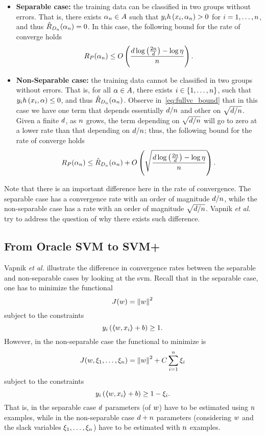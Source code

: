 \begin{itemize}
    \item \textbf{Separable case:} the training data can be classified in two groups without errors. That is, there exists $\alpha_n \in A$ such that $y_i h\left(x_i, \alpha_n\right) > 0$ for $i = 1, \ldots, n$, and thus $\hat{R}_{D_{n}}(\alpha_n) = 0$.
    In this case, the following bound for the rate of converge holds
    \begin{equation}
        \nonumber
        R_P(\alpha_n) \leq O\left( \frac{d \log\left(\frac{2n}{d} \right) - \log\eta}{n}  \right) .
    \end{equation}
    \item \textbf{Non-Separable case:} the training data cannot be classified in two groups without errors. That is, for all $\alpha \in A$, there exists $i \in \left\{1, \ldots, n\right\}$, such that $y_i h\left(x_i, \alpha\right) \leq 0$, and thus $\hat{R}_{D_{n}}(\alpha_n)$.
    Observe in~\eqref{eq:fullvc_bound} that in this case we have one term that depends essentially $d/n$ and other on $\sqrt{d/n}$. Given a finite $d$, as $n$ grows, the term depending on $\sqrt{d/n}$ will go to zero at a lower rate than that depending on $d/n$; thus, the following bound for the rate of converge holds
    \begin{equation}
        \label{eq:nonsep_bound}
        \exprisk(\param_\nsamples) \leq \empriskn(\param_\nsamples) + \bigO{\sqrt{\frac{\vc \log\left(\frac{2\nsamples}{\vc} \right) - \log\eta}{\nsamples}} } .
    \end{equation}
    
\end{itemize}
Note that there is an important difference here in the rate of convergence. The separable case has a convergence rate with an order of magnitude $d/n$, while the non-separable case has a rate with an order of magnitude $\sqrt{d/n}$. Vapnik \emph{et al.} try to address the question of why there exists such difference.

\subsection{From Oracle SVM to SVM+}
Vapnik \emph{et al.} illustrate the difference in convergence rates between the separable and non-separable cases by looking at the \acrshort{svm}. Recall that in the separable case, one has to minimize the functional 
$$J(w) = \left\lVert w\right\rVert^2$$
subject to the constraints
$$y_i \left( \bm{\left\langle} w, x_i \bm{\right\rangle} + b \right) \geq 1.$$
However, in the non-separable case the functional to minimize is 
$$J(w, \xi_1, \ldots, \xi_n) = \left\lVert w\right\rVert^2 + C \sum_{i=1}^n \xi_i$$
subject to the constraints
$$y_i \left( \bm{\left\langle} w, x_i \bm{\right\rangle} + b \right) \geq 1 - \xi_i.$$
That is, in the separable case $d$ parameters (of $w$) have to be estimated using $n$ examples, while in the non-separable case $d + n$ parameters (considering $w$ and the slack variables $\xi_1, \ldots, \xi_n$) have to be estimated with $n$ examples. 

